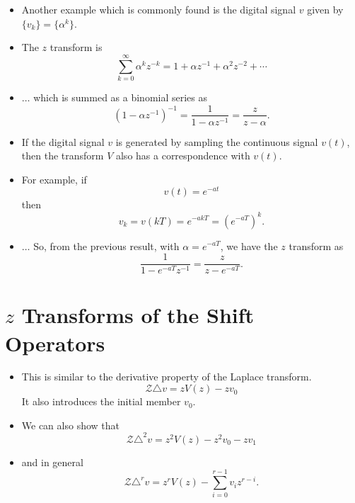 \begin{slide}\label{slide:l8s1b}

\begin{itemize}

\item Another example which is commonly found is the digital signal $v$
given by $\{v_k\} = \{\alpha^k\}$. 

\item The $z$ transform is
\[\sum_{k=0}^{\infty} \alpha^{k} z^{-k} = 1 + \alpha z^{-1} + \alpha^2
z^{-2}+\cdots\] 

\item $\ldots$ which is summed as a binomial series as
\[(1-\alpha z^{-1})^{-1} = \frac{1}{1-\alpha
  z^{-1}} = \frac{z}{z-\alpha}.\]

\end{itemize}

\end{slide}

\begin{slide}\label{slide:l8s1c}

\begin{itemize}

\item If the digital signal $v$ is generated by sampling the continuous
signal $v(t)$, then the transform $V$ also has a correspondence
with $v(t)$. 

\item For example, if \[v(t) = e^{-at}\] then \[v_k = v(kT)
= e^{-akT} = (e^{-aT})^k.\] 

\item $\ldots$ So, from the previous result, with
$\alpha=e^{-aT}$, we have the $z$ transform as
\[\frac{1}{1-e^{-aT}z^{-1}}=\frac{z}{z-e^{-aT}}.\]

\end{itemize}

\end{slide}

\section*{$z$ Transforms of the Shift Operators}

\begin{slide}\label{slide:l8s2}

\begin{itemize}
\item  This is similar to the derivative property of the Laplace
  transform.
 \[\mathcal{Z}\triangle v = z V(z) - zv_0\] It also introduces the initial member $v_0$.

\item  We can also show that
  \[\mathcal{Z}\triangle^2 v = z^2 V(z) - z^2 v_0 - z v_1\]
\item and in general
  \[\mathcal{Z}\triangle^r v = z^r V(z) - \sum_{i=0}^{r-1} v_i z^{r-i}.\]

\end{itemize}

\end{slide}

